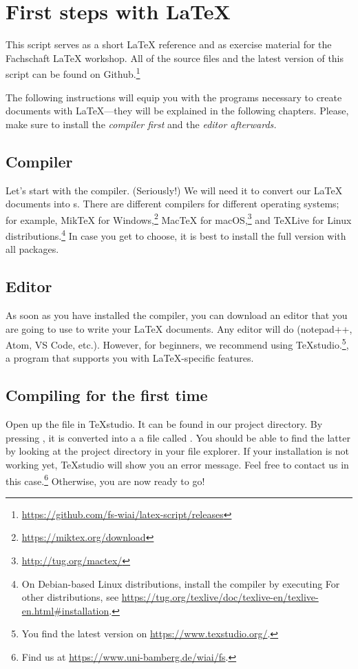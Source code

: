 \newpage
{}
\pagecolor{latexblue}

\chapter*{First steps with \LaTeX}

This script serves as a short \LaTeX{} reference and as exercise material for the Fachschaft  \LaTeX{} workshop.
All of the source files and the latest version of this script can be found on Github.\footnote{\url{https://github.com/fs-wiai/latex-script/releases}}

The following instructions will equip you with the programs necessary to create documents with \LaTeX{}---they will be explained in the following chapters.
Please, make sure to install the \emph{compiler first} and the \emph{editor afterwards}\textit{.}

\section*{Compiler}
Let’s start with the compiler.
(Seriously!)
We will need it to convert our \LaTeX{} documents into s.
There are different compilers for different operating systems;
for example, MikTeX for Windows,\footnote{\url{https://miktex.org/download}} Mac\TeX{} for macOS,\footnote{\url{http://tug.org/mactex/}} and \TeX{}Live for Linux distributions.\footnote{On Debian-based Linux distributions, install the compiler by executing 
For other distributions, see \url{https://tug.org/texlive/doc/texlive-en/texlive-en.html\#installation}.}
In case you get to choose, it is best to install the full version with all packages.

\section*{Editor}
As soon as you have installed the compiler, you can download an editor that you are going to use to write your \LaTeX{} documents.
Any editor will do (notepad++, Atom, VS Code, etc.).
However, for beginners, we recommend using \TeX{}studio.\footnote{You find the latest version on \url{https://www.texstudio.org/}.}, a program that supports you with \LaTeX-specific features.

\section*{Compiling for the first time}
Open up the file  in \TeX{}studio. 
It can be found in our project directory.
By pressing \faForward, it is converted into a a file called .
You should be able to find the latter by looking at the project directory in your file explorer.
If your installation is not working yet, \TeX{}studio will show you an error message.
Feel free to contact us in this case.\footnote{Find us at \url{https://www.uni-bamberg.de/wiai/fs}.}
Otherwise, you are now ready to go!

\newpage
\nopagecolor
